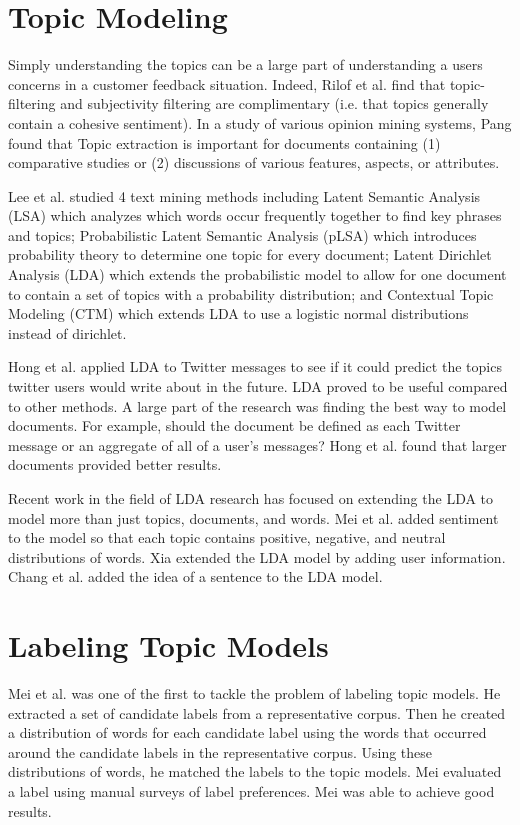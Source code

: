 \section{Topic Modeling}
Simply understanding the topics can be a large part of understanding a users concerns in a customer feedback situation.  Indeed, Rilof et al. \cite{riloff2005exploiting} find that topic-filtering and subjectivity filtering are complimentary (i.e. that topics generally contain a cohesive sentiment).  In a study of various opinion mining systems, Pang \cite{pang2008opinion} found that Topic extraction is important for documents containing (1) comparative studies or (2) discussions of various features, aspects, or attributes. 

Lee et al. \cite{lee2010empirical} studied 4 text mining methods including Latent Semantic Analysis (LSA) which analyzes which words occur frequently together to find key phrases and topics; Probabilistic Latent Semantic Analysis (pLSA) which introduces probability theory to determine one topic for every document; Latent Dirichlet Analysis (LDA) which extends the probabilistic model to allow for one document to contain a set of topics with a probability distribution; and Contextual Topic Modeling (CTM) \cite{blei2007correlated} which extends LDA to use a logistic normal distributions instead of dirichlet.

Hong et al. \cite{hong2010empirical} applied LDA to Twitter messages to see if it could predict the topics twitter users would write about in the future.  LDA proved to be useful compared to other methods.  A large part of the research was finding the best way to model documents.  For example, should the document be defined as each Twitter message or an aggregate of all of a user’s messages?  Hong et al. found that larger documents provided better results.

Recent work in the field of LDA research has focused on extending the LDA to model more than just topics, documents, and words.  Mei et al. \cite{mei2007topic} added sentiment to the model so that each topic contains positive, negative, and neutral distributions of words.  Xia  \cite{xia2011feature} extended the LDA model by adding user information.  Chang et al. \cite{chang2009latent} added the idea of a sentence to the LDA model.  

\section{Labeling Topic Models}
\label{section:related-work-labeling}
Mei et al. \cite{mei2007automatic} was one of the first to tackle the problem of labeling topic models.  He extracted a set of candidate labels from a representative corpus.  Then he created a distribution of words for each candidate label using the words that occurred around the candidate labels in the representative corpus.  Using these distributions of words, he matched the labels to the topic models.  Mei evaluated a label using manual surveys of label preferences.  Mei was able to achieve good results.

